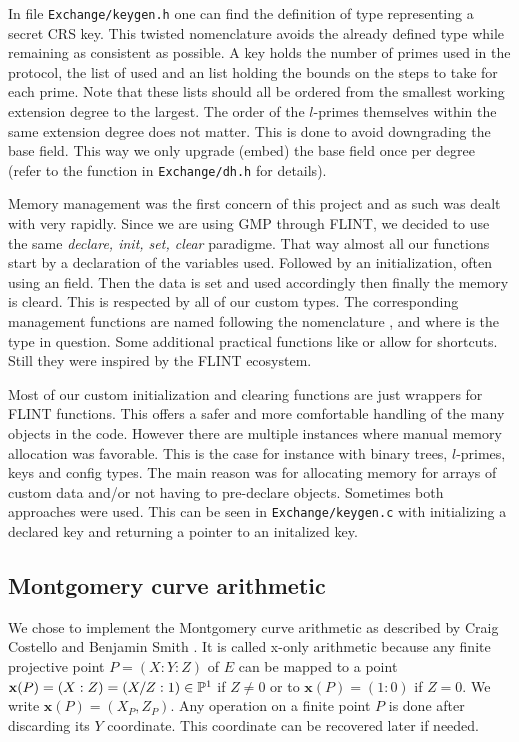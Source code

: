 \documentclass[../main.tex]{subfilesubs}
\begin{document}
In file \texttt{Exchange/keygen.h} one can find the definition of type  representing a secret CRS key.
This twisted nomenclature avoids the already defined  type while remaining as consistent as possible.
A key holds the number of primes used in the protocol, the list of  used and an  list holding the bounds on the steps to take for each prime.
Note that these lists should all be ordered from the smallest working extension degree to the largest.
The order of the $l$-primes themselves within the same extension degree does not matter.
This is done to avoid downgrading the base field.
This way we only upgrade (embed) the base field once per degree (refer to the  function  in \texttt{Exchange/dh.h} for details).

Memory management was the first concern of this project and as such was dealt with very rapidly.
Since we are using GMP through FLINT, we decided to use the same \textit{declare, init, set, clear} paradigme.
That way almost all our functions start by a declaration of the variables used.
Followed by an initialization, often using an  field.
Then the data is set and used accordingly then finally the memory is cleard.
This is respected by all of our custom types.
The corresponding management functions are named following the nomenclature ,  and  where \tF{*} is the type in question.
Some additional practical functions like  or  allow for shortcuts.
Still they were inspired by the FLINT ecosystem.

Most of our custom initialization and clearing functions are just wrappers for FLINT functions.
This offers a safer and more comfortable handling of the many objects in the code.
However there are multiple instances where manual memory allocation was favorable.
This is the case for instance with binary trees, $l$-primes, keys and config types.
The main reason was for allocating memory for arrays of custom data and/or not having to pre-declare objects.
Sometimes both approaches were used.
This can be seen in \texttt{Exchange/keygen.c} with  initializing a declared key and  returning a pointer to an initalized key.

\subsection{Montgomery curve arithmetic}

\newcommand{\x}{\textbf{x}}
\newcommand{\funct}[1]{\texttt{\detokenize{#1}}}
We chose to implement  the Montgomery curve arithmetic as described by Craig Costello and Benjamin Smith \cite{}.
It is called x-only arithmetic because any finite projective point $P = (X:Y:Z)$ of $E$ can be mapped to a point $\x(P)=(X:Z)=(X/Z:1)\in\PP^1$ if $Z\neq0$ or to $\x(P)=(1:0)$ if $Z=0$. We write $\x(P)=(X_P, Z_P)$.
Any operation on a finite point $P$ is done after discarding its $Y$ coordinate. This coordinate can be recovered later if needed.
\end{document}
